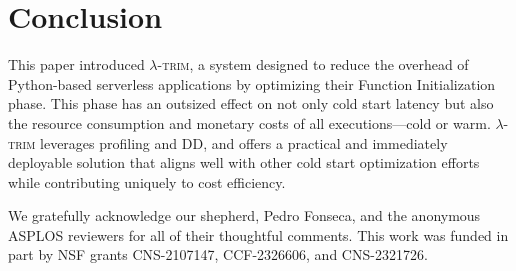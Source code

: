 \documentclass[sigplan,screen]{acmart}
\newcommand{\sys}{\textsc{\ensuremath{\lambda}-trim}\xspace}
\begin{document}
 

\section{Conclusion}

This paper introduced \sys, a system designed to reduce the overhead of Python-based serverless applications by optimizing their Function Initialization phase.
This phase has an outsized effect on not only cold start latency but also the resource consumption and monetary costs of all executions---cold or warm.
\sys leverages profiling and DD, and offers a practical and immediately deployable solution that aligns well with other cold start optimization efforts while contributing uniquely to cost efficiency.

 
\begin{acks}
We gratefully acknowledge our shepherd, Pedro Fonseca, and the anonymous ASPLOS reviewers for all of their thoughtful comments.
This work was funded in part by NSF grants CNS-2107147, CCF-2326606, and CNS-2321726.
\end{acks}







\end{document}
